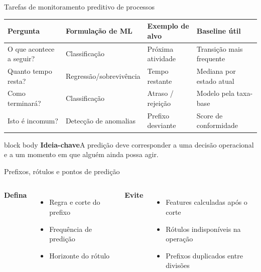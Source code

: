 \documentclass[aspectratio=169,11pt]{beamer}
\newcommand{\keyidea}[1]{%
  \begin{beamercolorbox}[rounded=true,sep=0.65em]{block body}
    \textbf{\color{Teal}Ideia-chave}\quad #1
  \end{beamercolorbox}
}
\begin{document}
\begin{frame}[shrink=6]{Tarefas de monitoramento preditivo de processos}
  \small
  \begin{tabular}{@{}
    >{\raggedright\arraybackslash}p{}
    >{\raggedright\arraybackslash}p{}
    >{\raggedright\arraybackslash}p{}
    >{\raggedright\arraybackslash}p{}@{}}
    \toprule
    Pergunta & Formulação de ML & Exemplo de alvo & Baseline útil\\
    \midrule
    O que acontece a seguir? & Classificação & Próxima atividade & Transição mais frequente\\
    Quanto tempo resta? & Regressão/sobrevivência & Tempo restante & Mediana por estado atual\\
    Como terminará? & Classificação & Atraso / rejeição & Modelo pela taxa-base\\
    Isto é incomum? & Detecção de anomalias & Prefixo desviante & Score de conformidade\\
    \bottomrule
  \end{tabular}
  \vspace{0.45cm}
  \keyidea{A predição deve corresponder a uma decisão operacional e a um momento em que alguém ainda possa agir.}
\end{frame}

\begin{frame}{Prefixos, rótulos e pontos de predição}
  \centering
  \vspace{0.55cm}
  \begin{columns}[T,onlytextwidth]
      \textbf{Defina}
      \begin{itemize}
        \item Regra e corte do prefixo
        \item Frequência de predição
        \item Horizonte do rótulo
      \end{itemize}
      \textbf{Evite}
      \begin{itemize}
        \item Features calculadas após o corte
        \item Rótulos indisponíveis na operação
        \item Prefixos duplicados entre divisões
      \end{itemize}
  \end{columns}
\end{frame}
\end{document}
